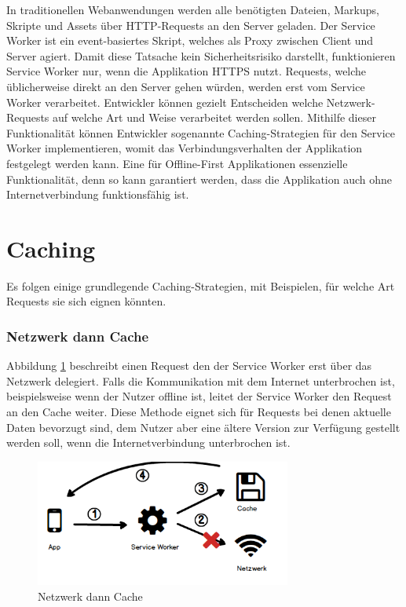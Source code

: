 \documentclass[a4paper, 12pt]{scrreprt}
\begin{document}
In traditionellen Webanwendungen werden alle benötigten Dateien, Markups, Skripte und Assets über \ac{HTTP}-Requests an den Server geladen. Der Service Worker ist ein event-basiertes Skript, welches als Proxy zwischen Client und Server agiert. Damit diese Tatsache kein Sicherheitsrisiko darstellt, funktionieren Service Worker nur, wenn die Applikation \ac{HTTPS} nutzt. Requests, welche üblicherweise direkt an den Server gehen würden, werden erst vom Service Worker verarbeitet. Entwickler können gezielt Entscheiden welche Netzwerk-Requests auf welche Art und Weise verarbeitet werden sollen. Mithilfe dieser Funktionalität können Entwickler sogenannte Caching-Strategien für den Service Worker implementieren, womit das Verbindungsverhalten der Applikation festgelegt werden kann\autocite{OnlineServiceWorkersAnIntroduction}. Eine für Offline-First Applikationen essenzielle Funktionalität, denn so kann garantiert werden, dass die Applikation auch ohne Internetverbindung funktionsfähig ist. 

\section{Caching}

Es folgen einige grundlegende Caching-Strategien, mit Beispielen, für welche Art Requests sie sich eignen könnten.

\subsubsection{Netzwerk dann Cache}
Abbildung \ref{fig:cachingNetworkFirst} beschreibt einen Request den der Service Worker erst über das Netzwerk delegiert. Falls die Kommunikation mit dem Internet unterbrochen ist, beispielsweise wenn der Nutzer offline ist, leitet der Service Worker den Request an den Cache weiter. Diese Methode eignet sich für Requests bei denen aktuelle Daten bevorzugt sind, dem Nutzer aber eine ältere Version zur Verfügung gestellt werden soll, wenn die Internetverbindung unterbrochen ist.

\begin{figure}[h]
	\centering
	\includegraphics[width=0.75\textwidth]{networkfirst.png}
	\caption{Netzwerk dann Cache}
	\label{fig:cachingNetworkFirst}
\end{figure}
\end{document}
